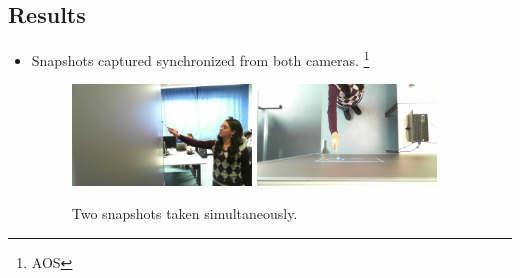 \documentclass[a4paper,12pt]{article}
\begin{document}
\subsection[Results]{Results}

\begin{itemize}
\item Snapshots captured synchronized from both cameras. \footnote{AOS}
\begin{figure}[H]
    \begin{center}
	\includegraphics[width=0.45\textwidth]{FrameSide}
	\includegraphics[width=0.45\textwidth]{FrameUp}
	\caption{Two snapshots taken simultaneously.}


\end{center}
\end{figure}
\end{itemize}
\end{document}
